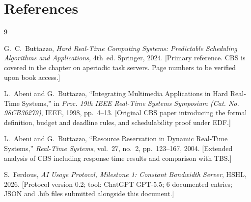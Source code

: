 \documentclass[conference]{IEEEtran}
\begin{document}
\section*{References}

\begin{thebibliography}{9}

G.~C.~Buttazzo,
\textit{Hard Real-Time Computing Systems: Predictable Scheduling
Algorithms and Applications}, 4th~ed.
Springer, 2024.
[Primary reference. CBS is covered in the chapter on aperiodic task
servers. Page numbers to be verified upon book access.]

L.~Abeni and G.~Buttazzo,
``Integrating Multimedia Applications in Hard Real-Time Systems,''
in \textit{Proc. 19th IEEE Real-Time Systems Symposium
(Cat. No. 98CB36279)}, IEEE, 1998, pp.~4--13.
[Original CBS paper introducing the formal definition, budget and
deadline rules, and schedulability proof under EDF.]

L.~Abeni and G.~Buttazzo,
``Resource Reservation in Dynamic Real-Time Systems,''
\textit{Real-Time Systems}, vol.~27, no.~2, pp.~123--167, 2004.
[Extended analysis of CBS including response time results and
comparison with TBS.]

S.~Ferdous,
\textit{AI Usage Protocol, Milestone 1: Constant Bandwidth Server},
HSHL, 2026.
[Protocol version 0.2; tool: ChatGPT GPT-5.5; 6 documented entries;
JSON and .bib files submitted alongside this document.]

\end{thebibliography}
\end{document}
